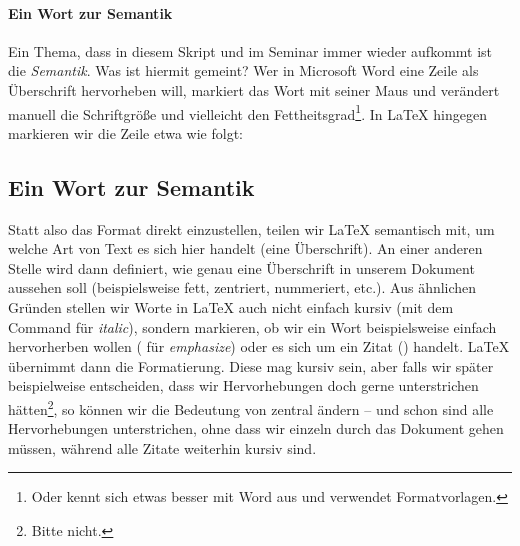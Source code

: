 \paragraph{Ein Wort zur Semantik}
Ein Thema, dass in diesem Skript und im Seminar immer wieder aufkommt ist die \emph{Semantik}.
Was ist hiermit gemeint?
Wer in Microsoft Word eine Zeile als Überschrift hervorheben will, markiert das Wort mit seiner Maus und verändert manuell die Schriftgröße und vielleicht den Fettheitsgrad\footnote{Oder kennt sich etwas besser mit Word aus und verwendet Formatvorlagen.}.
In \LaTeX{} hingegen markieren wir die Zeile etwa wie folgt:
\begin{latexlisting}
	\section{Ein Wort zur Semantik}
\end{latexlisting}
Statt also das Format direkt einzustellen, teilen wir \LaTeX{} semantisch mit, um welche Art von Text es sich hier handelt (eine Überschrift).
An einer anderen Stelle wird dann definiert, wie genau eine Überschrift in unserem Dokument aussehen soll (beispielsweise fett, zentriert, nummeriert, etc.).
Aus ähnlichen Gründen stellen wir Worte in \LaTeX{} auch nicht einfach kursiv (mit dem Command  für \emph{italic}), sondern markieren, ob wir ein Wort beispielsweise einfach hervorherben wollen ( für \emph{emphasize}) oder es sich um ein Zitat () handelt.
\LaTeX{} übernimmt dann die Formatierung.
Diese mag kursiv sein, aber falls wir später beispielweise entscheiden, dass wir Hervorhebungen doch gerne unterstrichen hätten\footnote{Bitte nicht.}, so können wir die Bedeutung von  zentral ändern -- und schon sind alle Hervorhebungen unterstrichen, ohne dass wir einzeln durch das Dokument gehen müssen, während alle Zitate weiterhin kursiv sind.

